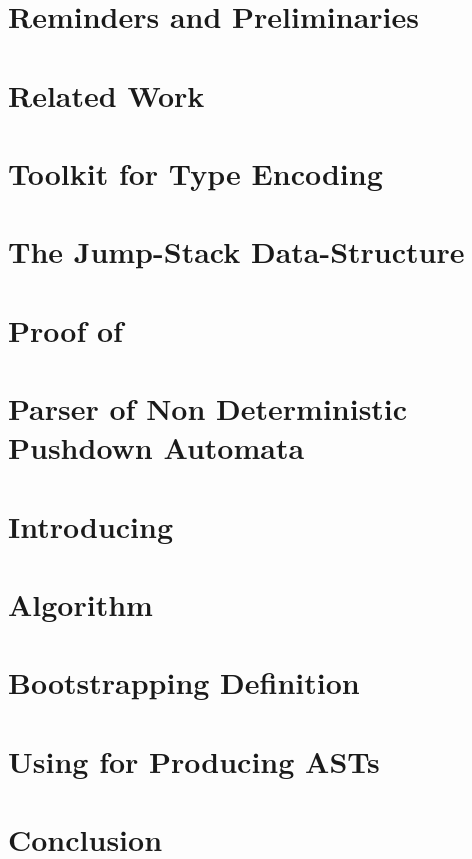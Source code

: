 \documentclass[a4paper,USenglish]{lipics}
\begin{document}
\section{Reminders and Preliminaries}
\label{Section:preliminaries}


\section{Related Work}
\label{Section:related}


\section{Toolkit for Type Encoding}
\label{Section:toolkit}


\section{The Jump-Stack Data-Structure}
\label{Section:jump}


\section{Proof of }
\label{Section:proof}


\section{Parser of Non Deterministic Pushdown Automata}
\label{Section:bridge}


\section{Introducing \Self}
\label{Section:fajita}
% 

\section{Algorithm}
\label{Section:algorithm}
% 

\section{Bootstrapping Definition}
\label{Section:bootstrapping}
% 

\section{Using \Self for Producing ASTs}
\label{Section:AST}
% 

\section{Conclusion}
\label{Section:zz}


\small

\end{document}
